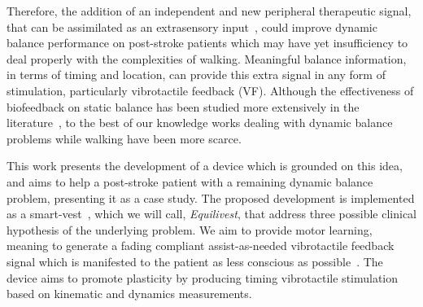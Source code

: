 \documentclass[conference]{IEEEtran}
\begin{document}


Therefore, the addition of an independent and new peripheral therapeutic signal, that can be assimilated as an extrasensory input~\cite{Brandebusemeyer.etal2021},  could improve dynamic balance performance on post-stroke patients which may have yet insufficiency to deal properly with the complexities of walking.  Meaningful balance information, in terms of timing and location, can provide this extra signal in any form of stimulation, particularly vibrotactile feedback (VF).  Although the effectiveness of biofeedback on static balance has been studied more extensively in the literature~\cite{DeAngelis.etal2021}, to the best of our knowledge works dealing with dynamic balance problems while walking have been more scarce.

This work presents the development of a device which is grounded on this idea, and aims to help a post-stroke patient with a remaining dynamic balance problem, presenting it as a case study.  The proposed development is implemented as a smart-vest~\cite{Brandebusemeyer.etal2021}, which we will call, \textit{Equilivest}, that address three possible clinical hypothesis of the underlying problem.  We aim to provide motor learning, meaning to generate a fading compliant assist-as-needed vibrotactile feedback signal which is manifested to the patient as less conscious as possible~\cite{Srivastava.etal2016,Donato.etal2016}.  The device aims to promote plasticity by producing timing vibrotactile stimulation based on kinematic and dynamics measurements.  



\end{document}
